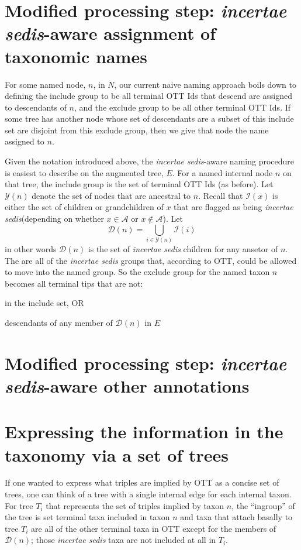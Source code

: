 \documentclass[11pt]{article}
\newcommand{\insed}{{\em incertae sedis}\xspace}
\newcommand{\naiveFullTree}{\ensuremath{N}\xspace}
\newcommand{\augmentedFullTree}{\ensuremath{E}\xspace}
\newcommand{\insedChildren}[1]{\ensuremath{\mathcal{I}(#1)}\xspace}
\begin{document}
\section{Modified processing step: \insed-aware assignment of taxonomic names}
For some named node, $n$, in \naiveFullTree, our current naive naming approach
    boils down to defining the include group to be all terminal OTT Ids that descend are assigned to descendants of $n$, and 
    the exclude group to be all other terminal OTT Ids.
If some tree has another node whose set of descendants are a subset of this include
    set are disjoint from this exclude group, then we give that node the name assigned to $n$.

Given the notation introduced above, the \insed-aware naming procedure is easiest to describe on the augmented tree, \augmentedFullTree.
For a named internal node $n$ on that tree, the include group is the set of terminal 
    OTT Ids (as before).
Let $\mathcal{Y}(n)$ denote the set of nodes that are ancestral to $n$.
Recall that $\insedChildren{x}$ is either the set of children or grandchildren of $x$ that 
    are flagged as being \insed (depending on whether $x\in\mathcal{A}$ or $x\notin\mathcal{A}$).
Let $$\mathcal{D}(n) =\bigcup_{i\in\mathcal{Y}(n)}\insedChildren{i}$$
in other words $\mathcal{D}(n)$ is the set of \insed children for any ansetor of $n$.
The are all of the \insed groups that, according to OTT, could be allowed to move into the named
    group.
So the exclude group for the named taxon $n$ becomes all terminal tips that are not:
\begin{compactitem}
    \item in the include set, OR
    \item descendants of any member of $\mathcal{D}(n)$ in \augmentedFullTree
\end{compactitem}
\section{Modified processing step: \insed-aware other annotations}

\section{Expressing the information in the taxonomy via a set of trees}
If one wanted to express what triples are implied by OTT as a concise set of
    trees, one can think of a tree with a single internal edge for each internal taxon.
For tree $T_i$ that represents the set of triples implied by taxon $n$, the
    ``ingroup'' of the tree is set terminal taxa included in taxon $n$ and taxa
    that attach basally to tree $T_i$ are all of the other terminal taxa in OTT
    except for the members of $\mathcal{D}(n)$;
    those \insed taxa are not included at all in $T_i$.

\end{document}
